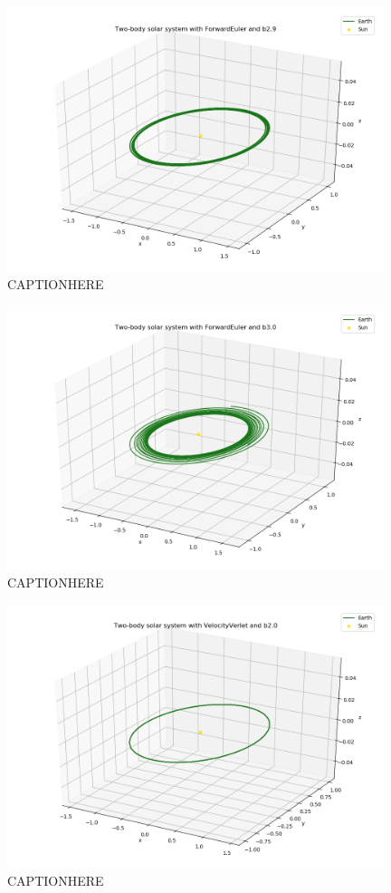 \documentclass{article}
\begin{document}
    \begin{figure}[H]
        \centering
        \includegraphics[width = 11cm]{img/plot3D_S_E_F_b29.png}
        \caption{CAPTIONHERE}
        \label{fig:plot3D_S_E_F_b29}
    \end{figure}

    \begin{figure}[H]
        \centering
        \includegraphics[width = 11cm]{img/plot3D_S_E_F_b30.png}
        \caption{CAPTIONHERE}
        \label{fig:plot3D_S_E_F_b30}
    \end{figure}

    \begin{figure}[H]
        \centering
        \includegraphics[width = 11cm]{img/plot3D_S_E_V_b20.png}
        \caption{CAPTIONHERE}
        \label{fig:plot3D_S_E_V_b20}
    \end{figure}
\end{document}
